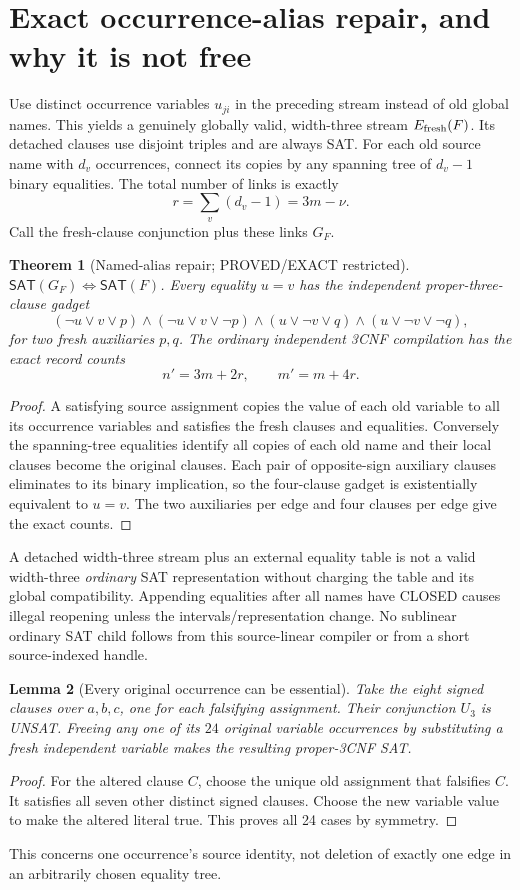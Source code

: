 \documentclass[11pt]{article}
\newtheorem{theorem}{Theorem}
\newtheorem{lemma}[theorem]{Lemma}
\newcommand{\SAT}{\mathsf{SAT}}
\begin{document}
\section{Exact occurrence-alias repair, and why it is not free}
Use distinct occurrence variables $u_{ji}$ in the preceding stream
instead of old global names. This yields a genuinely globally valid,
width-three stream $E_{\rm fresh}(F)$. Its detached clauses use disjoint
triples and are always SAT. For each old source name with $d_v$
occurrences, connect its copies by any spanning tree of $d_v-1$
binary equalities. The total number of links is exactly
\[
r=\sum_v(d_v-1)=3m-\nu.
\]
Call the fresh-clause conjunction plus these links $G_F$.

\begin{theorem}[Named-alias repair; PROVED/EXACT restricted]
$\SAT(G_F)\iff\SAT(F)$. Every equality $u=v$ has the independent
proper-three-clause gadget
\[
(\neg u\vee v\vee p)\wedge(\neg u\vee v\vee\neg p)
\wedge(u\vee\neg v\vee q)\wedge(u\vee\neg v\vee\neg q),
\]
for two fresh auxiliaries $p,q$. The ordinary independent 3CNF
compilation has the exact record counts
\[
\boxed{n'=3m+2r,\qquad m'=m+4r.}
\]
\end{theorem}
\begin{proof}
A satisfying source assignment copies the value of each old
variable to all its occurrence variables and satisfies the
fresh clauses and equalities. Conversely the spanning-tree
equalities identify all copies of each old name and their
local clauses become the original clauses. Each pair of
opposite-sign auxiliary clauses eliminates to its binary
implication, so the four-clause gadget is existentially
equivalent to $u=v$. The two auxiliaries per edge and four
clauses per edge give the exact counts.
\end{proof}
A detached width-three stream plus an external equality table is
not a valid width-three \emph{ordinary} SAT representation
without charging the table and its global compatibility.
Appending equalities after all names have CLOSED causes
illegal reopening unless the intervals/representation change.
No sublinear ordinary SAT child follows from this source-linear
compiler or from a short source-indexed handle.

\begin{lemma}[Every original occurrence can be essential]
Take the eight signed clauses over $a,b,c$, one for each falsifying
assignment. Their conjunction $U_3$ is UNSAT. Freeing \emph{any one}
of its $24$ original variable occurrences by substituting a fresh
independent variable makes the resulting proper-3CNF SAT.
\end{lemma}
\begin{proof}
For the altered clause $C$, choose the unique old assignment
that falsifies $C$. It satisfies all seven other distinct signed
clauses. Choose the new variable value to make the altered
literal true. This proves all 24 cases by symmetry.
\end{proof}
This concerns one occurrence's source identity, not deletion
of exactly one edge in an arbitrarily chosen equality tree.
\end{document}
